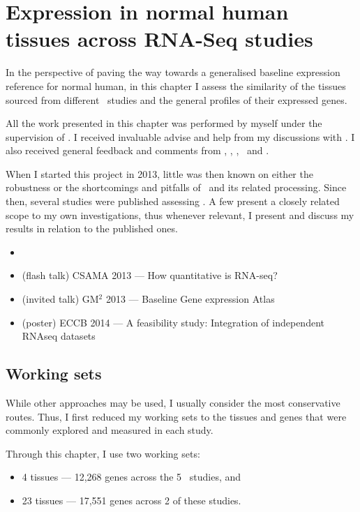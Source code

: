 \chapter{Expression in normal human tissues across RNA-Seq studies}
\label{ch:Transcriptomics}

In the perspective of paving the way towards
a generalised baseline expression reference for normal human,
in this chapter I assess the similarity
of the tissues sourced from different \Rnaseq\ studies and
the general profiles of their expressed genes.

All the work presented in this chapter was performed by myself under the
supervision of \alvis.
I received invaluable advise and help from my discussions with \nuno.
I also received general feedback and comments from \mar, \johan, \sarah, \gos\
and \wolfgang.

When I started this project in 2013,
little was then known on either the robustness or
the shortcomings and pitfalls of \Rnaseq\ and
its related processing.
Since then, several studies were published assessing \Rnaseq.
A few present a closely related scope to my own investigations, thus
whenever relevant,
I present and discuss my results in relation to the published ones.


\begin{itemize}[topsep=0pt,nosep]
    \item {}
    \item (flash talk) CSAMA 2013 --- How quantitative is RNA-seq?
    \item (invited talk) GM$^2$ 2013 --- Baseline Gene expression Atlas
    \item (poster) ECCB 2014 --- A feasibility study:
        Integration of independent RNAseq datasets
\end{itemize}

\clearpage

\section{Working sets}

While other approaches may be used,
I usually consider the most conservative routes.
Thus, I first reduced my working sets to the tissues and genes that were
commonly explored and measured in each study.

Through this chapter, I use two working sets:
\begin{itemize}[topsep=0pt,nosep]
    \item 4 tissues --- 12,268 genes across the 5 \Rnaseq\ studies, and
    \item 23 tissues --- 17,551 genes across 2 of these studies.
\end{itemize}

